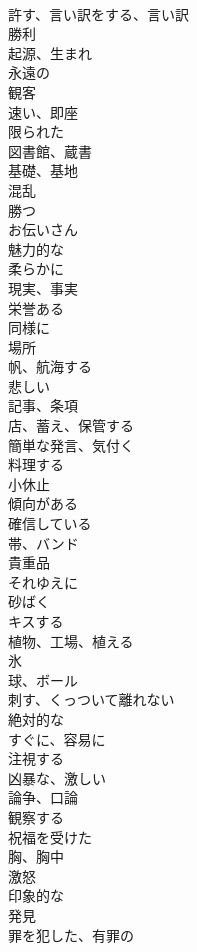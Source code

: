 \documentclass[8pt]{extreport}
\begin{document}
\begin{CJK}{UTF8}{min}
\\	許す、言い訳をする、言い訳	
\\	勝利	
\\	起源、生まれ	
\\	永遠の	
\\	観客	
\\	速い、即座	
\\	限られた	
\\	図書館、蔵書	
\\	基礎、基地	
\\	混乱	
\\	勝つ	
\\	お伝いさん	
\\	魅力的な	
\\	柔らかに	
\\	現実、事実	
\\	栄誉ある	
\\	同様に	
\\	場所	
\\	帆、航海する	
\\	悲しい	
\\	記事、条項	
\\	店、蓄え、保管する	
\\	簡単な発言、気付く	
\\	料理する	
\\	小休止	
\\	傾向がある	
\\	確信している	
\\	帯、バンド	
\\	貴重品	
\\	それゆえに	
\\	砂ばく	
\\	キスする	
\\	植物、工場、植える	
\\	氷	
\\	球、ボール	
\\	刺す、くっついて離れない	
\\	絶対的な	
\\	すぐに、容易に	
\\	注視する	
\\	凶暴な、激しい	
\\	論争、口論	
\\	観察する	
\\	祝福を受けた	
\\	胸、胸中	
\\	激怒	
\\	印象的な	
\\	発見	
\\	罪を犯した、有罪の	

\end{CJK}
\end{document}
